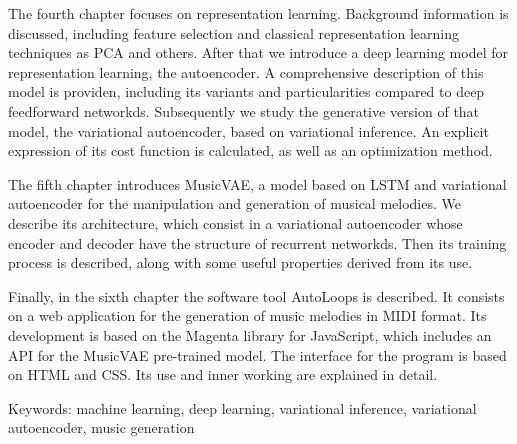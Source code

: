 The fourth chapter focuses on representation learning. Background information is discussed, including feature selection and classical representation learning techniques as PCA and others. After that we introduce a deep learning model for representation learning, the autoencoder. A comprehensive description of this model is providen, including its variants and particularities compared to deep feedforward networkds. Subsequently we study the generative version of that model, the variational autoencoder, based on variational inference. An explicit expression of its cost function is calculated, as well as an optimization method.

The fifth chapter introduces MusicVAE, a model based on LSTM and variational autoencoder for the manipulation and generation of musical melodies. We describe its architecture, which consist in a variational autoencoder whose encoder and decoder have the structure of recurrent networkds. Then its training process is described, along with some useful properties derived from its use.

Finally, in the sixth chapter the software tool AutoLoops is described. It consists on a web application for the generation of music melodies in MIDI format. Its development is based on the Magenta library for JavaScript, which includes an API for the MusicVAE pre-trained model. The interface for the program is based on HTML and CSS. Its use and inner working are explained in detail.

Keywords: machine learning, deep learning, variational inference, variational autoencoder, music generation

\endinput
